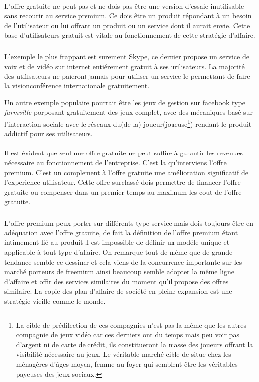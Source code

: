 \documentclass[11pt, a4paper ]{article}
\begin{document}
\begin{spacing}{1.5}
\paragraph{} %
L'offre gratuite ne peut pas et ne dois pas être une version d'essaie inutilisable sans recourir au service premium. Ce dois être un produit répondant à un besoin de l'utilisateur ou lui offrant un produit ou un service dont il aurait envie. Cette base d'utilisateurs gratuit est vitale au fonctionnement de cette stratégie d'affaire.

\subparagraph{} %
L'exemple le plus frappant est surement Skype, ce dernier propose un service de voix et de vidéo sur internet entiérement gratuit à ses urilisateurs. La majorité des utilisateurs ne paieront jamais pour utiliser un service le permettant de faire la visionconférence internationale gratuitement.

Un autre exemple populaire pourrait être les jeux de gestion sur facebook type \emph{farmville} porposant gratuitement des jeux complet, avec des mécaniques basé sur l'interaction sociale avec le réseaux du(de la) joueur(joueuse\footnote{La cible de prédilection de ces compagnies n'est pas la même que les autres compagnie de jeux vidéo car ces derniers ont du temps mais peu voir pas d'argent ni de carte de crédit, ils constitueront la masse des joueurs offrant la visibilité nécessaire au jeux. Le véritable marché cible de situe chez les ménagères d'âges moyen, femme au foyer qui semblent être les véritables payeuses des jeux sociaux. }) rendant le produit addictif pour ses utilisateurs.

\paragraph{} %
Il est évident que seul une offre gratuite ne peut suffire à garantir les revenues nécessaire au fonctionnement de l'entreprise. C'est la qu'interviens l'offre premium. C'est un complement à l'offre gratuite une amélioration significatif de l'experience utilisateur. Cette offre surclassé dois permettre de financer l'offre gratuite ou compenser dans un premier temps au maximum les cout de l'offre gratuite.
\subparagraph{}
L'offre premium peux porter sur différents type service mais dois toujours être en adéquation avec l'offre gratuite, de fait la définition de l'offre premium étant intimement lié au produit il est impossible de définir un modéle unique et applicable à tout type d'affaire. On remarque tout de même que de grande tendance semble ce dessiner et cela viens de la concurrence importante sur les marché porteurs de freemium ainsi beaucoup semble adopter la même ligne d'affaire et offir des services similaires du moment qu'il propose des offres similaire. La copie des plan d'affaire de société en pleine expansion est une stratégie vieille comme le monde.


\end{spacing}
\end{document}
